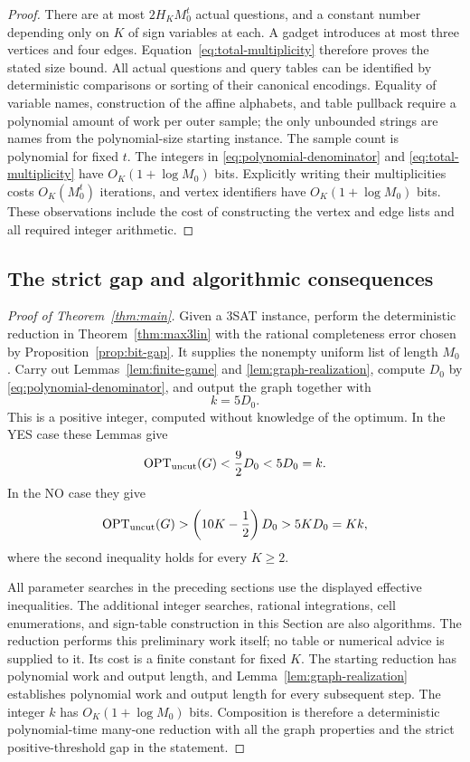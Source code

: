 \begin{proof}
There are at most $2H_KM_0^t$ actual questions, and a constant number
depending only on $K$ of sign variables at each. A gadget introduces at
most three vertices and four edges. Equation~\eqref{eq:total-multiplicity}
therefore proves the stated size bound. All actual questions and query
tables can be identified by deterministic comparisons or sorting of
their canonical encodings. Equality of variable names, construction of
the affine alphabets, and table pullback require a polynomial amount of
work per outer sample; the only unbounded strings are names from the
polynomial-size starting instance. The sample count is polynomial for
fixed $t$. The integers in \eqref{eq:polynomial-denominator} and
\eqref{eq:total-multiplicity} have $O_K(1+\log M_0)$ bits. Explicitly
writing their multiplicities costs $O_K(M_0^t)$ iterations, and vertex
identifiers have $O_K(1+\log M_0)$ bits. These observations include the
cost of constructing the vertex and edge lists and all required integer
arithmetic.
\end{proof}

\subsection{The strict gap and algorithmic consequences}

\begin{proof}[Proof of Theorem~\ref{thm:main}]
Given a $3$SAT instance, perform the deterministic reduction in
Theorem~\ref{thm:max3lin} with the rational completeness error chosen by
Proposition~\ref{prop:bit-gap}. It supplies the nonempty uniform list of
length $M_0$. Carry out Lemmas~\ref{lem:finite-game} and
\ref{lem:graph-realization}, compute $D_0$ by
\eqref{eq:polynomial-denominator}, and output the graph together with
\[
 k=5D_0.
\]
This is a positive integer, computed without knowledge of the optimum.
In the YES case these Lemmas give
\[
 \operatorname{OPT}_{\mathrm{uncut}}(G)<\frac92D_0<5D_0=k.
\]
In the NO case they give
\[
 \operatorname{OPT}_{\mathrm{uncut}}(G)>
       \left(10K-\frac12\right)D_0
       >5KD_0=Kk,
\]
where the second inequality holds for every $K\ge2$.

All parameter searches in the preceding sections use the displayed
effective inequalities. The additional integer searches, rational
integrations, cell enumerations, and sign-table construction in this
Section are also algorithms. The reduction performs this preliminary
work itself; no table or numerical advice is supplied to it. Its cost
is a finite constant for fixed $K$. The starting reduction has
polynomial work and output length, and Lemma~\ref{lem:graph-realization}
establishes polynomial work and output length for every subsequent
step. The integer $k$ has $O_K(1+\log M_0)$ bits. Composition is
therefore a deterministic polynomial-time many-one reduction with all
the graph properties and the strict positive-threshold gap in the
statement.
\end{proof}

